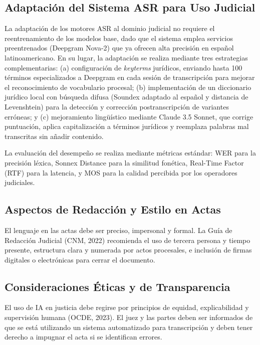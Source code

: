 \documentclass[12pt,a4paper,oneside]{report}
\begin{document}
\subsection{Adaptación del Sistema ASR para Uso Judicial}

La adaptación de los motores ASR al dominio judicial no requiere el reentrenamiento de los modelos base, dado que el sistema emplea servicios preentrenados (Deepgram Nova-2) que ya ofrecen alta precisión en español latinoamericano. En su lugar, la adaptación se realiza mediante tres estrategias complementarias: (a) configuración de \textit{keyterms} jurídicos, enviando hasta 100 términos especializados a Deepgram en cada sesión de transcripción para mejorar el reconocimiento de vocabulario procesal; (b) implementación de un diccionario jurídico local con búsqueda difusa (Soundex adaptado al español y distancia de Levenshtein) para la detección y corrección postranscripción de variantes erróneas; y (c) mejoramiento lingüístico mediante Claude 3.5 Sonnet, que corrige puntuación, aplica capitalización a términos jurídicos y reemplaza palabras mal transcritas sin añadir contenido.

La evaluación del desempeño se realiza mediante métricas estándar: WER para la precisión léxica, Sonnex Distance para la similitud fonética, Real-Time Factor (RTF) para la latencia, y MOS para la calidad percibida por los operadores judiciales.

\subsection{Aspectos de Redacción y Estilo en Actas}

El lenguaje en las actas debe ser preciso, impersonal y formal. La Guía de Redacción Judicial (CNM, 2022) recomienda el uso de tercera persona y tiempo presente, estructura clara y numerada por actos procesales, e inclusión de firmas digitales o electrónicas para cerrar el documento.

\subsection{Consideraciones Éticas y de Transparencia}

El uso de IA en justicia debe regirse por principios de equidad, explicabilidad y supervisión humana (OCDE, 2023). El juez y las partes deben ser informados de que se está utilizando un sistema automatizado para transcripción y deben tener derecho a impugnar el acta si se identifican errores.
\end{document}

